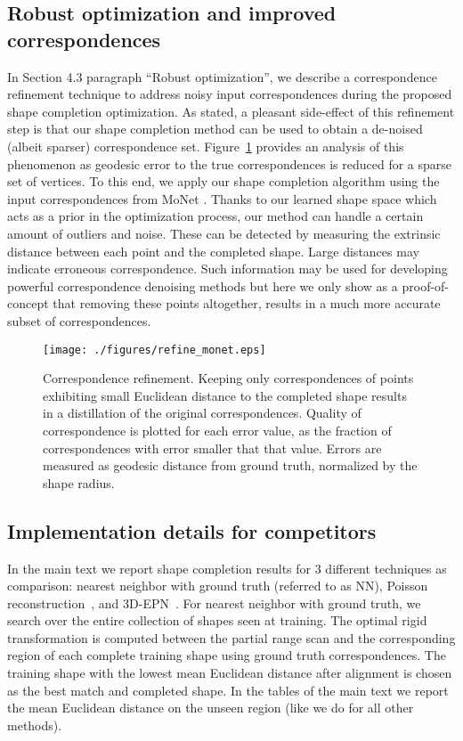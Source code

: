\subsection{Robust optimization and improved correspondences}
In Section 4.3 paragraph ``Robust optimization'', we describe a correspondence refinement technique to address noisy input correspondences during the proposed shape completion optimization. As stated, a pleasant side-effect of this refinement step is that our shape completion method can be used to obtain a de-noised (albeit sparser) correspondence set. Figure~\ref{fig:monet_refine} provides an analysis of this phenomenon as geodesic error to the true correspondences is reduced for a sparse set of vertices. To this end, we apply our shape completion algorithm using the input correspondences from MoNet \cite{monet}. Thanks to our learned shape space which acts as a prior in the optimization process, our method can handle a certain amount of outliers and noise. These can be detected by measuring the extrinsic distance between each point and the completed shape. Large distances may indicate erroneous correspondence. Such information may be used for developing powerful correspondence denoising methods but here we only show as a proof-of-concept that removing these points altogether, results in a much more accurate subset of correspondences.   

\begin{figure}[th]
\centering
\texttt{[image: ./figures/refine\_monet.eps]}
\caption{Correspondence refinement. Keeping only correspondences of points exhibiting small Euclidean distance to the completed shape results in a distillation of the original correspondences. Quality of correspondence is plotted for each error value, as the fraction of correspondences with error smaller that that value. Errors are measured as geodesic distance from ground truth, normalized by the shape radius.} 
\label{fig:monet_refine}
\end{figure}


\subsection{Implementation details for competitors}
In the main text we report shape completion results for 3 different techniques as comparison: nearest neighbor with ground truth (referred to as NN), Poisson reconstruction~\cite{kazhdan2013screened}, and 3D-EPN~\cite{dai2016shape}.
For nearest neighbor with ground truth, we search over the entire collection of shapes seen at training. The optimal rigid transformation is computed between the partial range scan and the corresponding region of each complete training shape using ground truth correspondences. The training shape with the lowest mean Euclidean distance after alignment is chosen as the best match and completed shape. In the tables of the main text we report the mean Euclidean distance on the unseen region (like we do for all other methods). %

